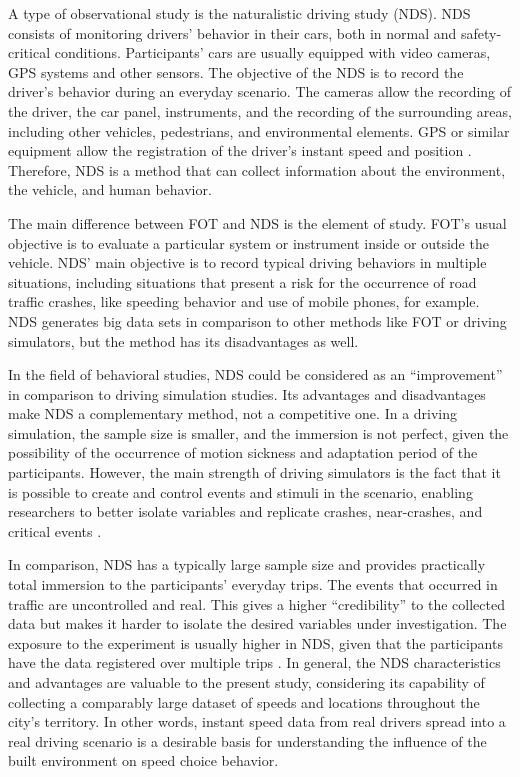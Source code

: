 A type of observational study is the naturalistic driving study (NDS). NDS consists of monitoring drivers' behavior in their cars, both in normal and safety-critical conditions. Participants' cars are usually equipped with video cameras, GPS systems and other sensors. The objective of the NDS is to record the driver's behavior during an everyday scenario. The cameras allow the recording of the driver, the car panel, instruments, and the recording of the surrounding areas, including other vehicles, pedestrians, and environmental elements. GPS or similar equipment allow the registration of the driver's instant speed and position \cite{Shinar2017}. Therefore, NDS is a method that can collect information about the environment, the vehicle, and human behavior.

The main difference between FOT and NDS is the element of study. FOT's usual objective is to evaluate a particular system or instrument inside or outside the vehicle. NDS' main objective is to record typical driving behaviors in multiple situations, including situations that present a risk for the occurrence of road traffic crashes, like speeding behavior and use of mobile phones, for example. NDS generates big data sets in comparison to other methods like FOT or driving simulators, but the method has its disadvantages as well. 

In the field of behavioral studies, NDS could be considered as an ``improvement'' in comparison to driving simulation studies. Its advantages and disadvantages make NDS a complementary method, not a competitive one. In a driving simulation, the sample size is smaller, and the immersion is not perfect, given the possibility of the occurrence of motion sickness and adaptation period of the participants. However, the main strength of driving simulators is the fact that it is possible to create and control events and stimuli in the scenario, enabling researchers to better isolate variables and replicate crashes, near-crashes, and critical events \cite{Shinar2017}.   

In comparison, NDS has a typically large sample size and provides practically total immersion to the participants' everyday trips. The events that occurred in traffic are uncontrolled and real. This gives a higher ``credibility'' to the collected data but makes it harder to isolate the desired variables under investigation. The exposure to the experiment is usually higher in NDS, given that the participants have the data registered over multiple trips \cite{Carsten2013}. In general, the NDS characteristics and advantages are valuable to the present study, considering its capability of collecting a comparably large dataset of speeds and locations throughout the city's territory. In other words, instant speed data from real drivers spread into a real driving scenario is a desirable basis for understanding the influence of the built environment on speed choice behavior.


